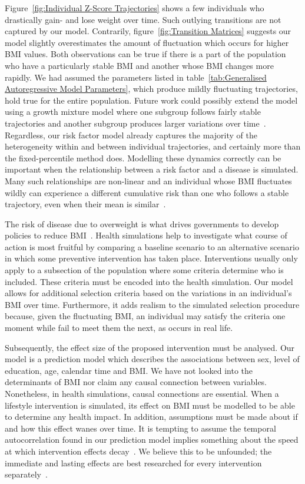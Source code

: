 \documentclass{imammb}
\numberwithin{equation}{section}
\begin{document}
Figure~\ref{fig:Individual Z-Score Trajectories} shows a few individuals who drastically gain- and lose weight over time. Such outlying transitions are not captured by our model. Contrarily, figure~\ref{fig:Transition Matrices} suggests our model slightly overestimates the amount of fluctuation which occurs for higher BMI values. Both observations can be true if there is a part of the population who have a particularly stable BMI and another whose BMI changes more rapidly. We had assumed the parameters listed in table~\ref{tab:Generalised Autoregressive Model Parameters}, which produce mildly fluctuating trajectories, hold true for the entire population. Future work could possibly extend the model using a growth mixture model where one subgroup follows fairly stable trajectories and another subgroup produces larger variations over time~\citep{Herle2020}. Regardless, our risk factor model already captures the majority of the heterogeneity within and between individual trajectories, and certainly more than the fixed-percentile method does. Modelling these dynamics correctly can be important when the relationship between a risk factor and a disease is simulated. Many such relationships are non-linear and an individual whose BMI fluctuates wildly can experience a different cumulative risk than one who follows a stable trajectory, even when their mean is similar~\citep{Murray2020}.

The risk of disease due to overweight is what drives governments to develop policies to reduce BMI~\citep{VWS2018}. Health simulations help to investigate what course of action is most fruitful by comparing a baseline scenario to an alternative scenario in which some preventive intervention has taken place. Interventions usually only apply to a subsection of the population where some criteria determine who is included. These criteria must be encoded into the health simulation. Our model allows for additional selection criteria based on the variations in an individual's BMI over time. Furthermore, it adds realism to the simulated selection procedure because, given the fluctuating BMI, an individual may satisfy the criteria one moment while fail to meet them the next, as occurs in real life.

Subsequently, the effect size of the proposed intervention must be analysed. Our model is a prediction model which describes the associations between sex, level of education, age, calendar time and BMI. We have not looked into the determinants of BMI nor claim any causal connection between variables. Nonetheless, in health simulations, causal connections are essential. When a lifestyle intervention is simulated, its effect on BMI must be modelled to be able to determine any health impact. In addition, assumptions must be made about if and how this effect wanes over time. It is tempting to assume the temporal autocorrelation found in our prediction model implies something about the speed at which intervention effects decay~\citep{Bayer2011}. We believe this to be unfounded; the immediate and lasting effects are best researched for every intervention separately~\citep{VanRinsum2018}.
\end{document}
